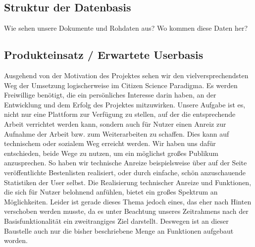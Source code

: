 \documentclass{article}
\begin{document}

\subsection{Struktur der Datenbasis}
Wie sehen unsere Dokumente und Rohdaten aus?
Wo kommen diese Daten her?

\subsection{Produkteinsatz / Erwartete Userbasis}
Ausgehend von der Motivation des Projektes sehen wir den vielversprechendsten Weg der Umsetzung logischerweise im Citizen Science Paradigma.
Es werden Freiwillige benötigt, die ein persönliches Interesse darin haben, an der Entwicklung und dem Erfolg des Projektes mitzuwirken.
Unsere Aufgabe ist es, nicht nur eine Plattform zur Verfügung zu stellen, auf der die entsprechende Arbeit verrichtet werden kann,
sondern auch für Nutzer einen Anreiz zur Aufnahme der Arbeit bzw. zum Weiterarbeiten zu schaffen.
Dies kann auf technischem oder sozialem Weg erreicht werden.
Wir haben uns dafür entschieden, beide Wege zu nutzen, um ein möglichst großes Publikum anzusprechen.
So haben wir technische Anreize beispielsweise über auf der Seite veröffentlichte Bestenlisten realisiert, oder durch einfache,
schön anzuschauende Statistiken der User selbst. Die Realisierung technischer Anreize und Funktionen, die sich für Nutzer belohnend anfühlen,
bietet ein großes Spektrum an Möglichkeiten.
Leider ist gerade dieses Thema jedoch eines, das eher nach Hinten verschoben werden musste,
da es unter Beachtung unseres Zeitrahmens nach der Basisfunktionalität ein zweitrangiges Ziel darstellt.
Deswegen ist an dieser Baustelle auch nur die bisher beschriebene Menge an Funktionen aufgebaut worden.%
\end{document}
